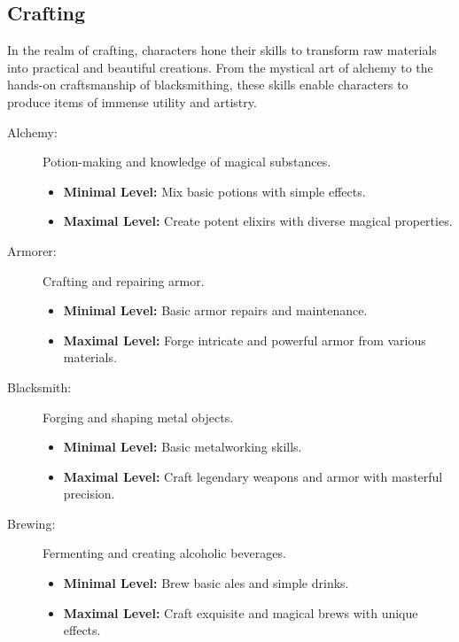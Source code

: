 \subsection{\textbf{Crafting}}

In the realm of crafting, characters hone their skills to transform raw materials into practical and beautiful creations. From the mystical art of alchemy to the hands-on craftsmanship of blacksmithing, these skills enable characters to produce items of immense utility and artistry. 

\begin{description}
    \item[Alchemy:] Potion-making and knowledge of magical substances.
        \begin{itemize}
            \item \textbf{Minimal Level:} Mix basic potions with simple effects.
            \item \textbf{Maximal Level:} Create potent elixirs with diverse magical properties.
        \end{itemize}

    \item[Armorer:] Crafting and repairing armor.
        \begin{itemize}
            \item \textbf{Minimal Level:} Basic armor repairs and maintenance.
            \item \textbf{Maximal Level:} Forge intricate and powerful armor from various materials.
        \end{itemize}

    \item[Blacksmith:] Forging and shaping metal objects.
        \begin{itemize}
            \item \textbf{Minimal Level:} Basic metalworking skills.
            \item \textbf{Maximal Level:} Craft legendary weapons and armor with masterful precision.
        \end{itemize}

    \item[Brewing:] Fermenting and creating alcoholic beverages.
        \begin{itemize}
            \item \textbf{Minimal Level:} Brew basic ales and simple drinks.
            \item \textbf{Maximal Level:} Craft exquisite and magical brews with unique effects.
        \end{itemize}


\end{description}
